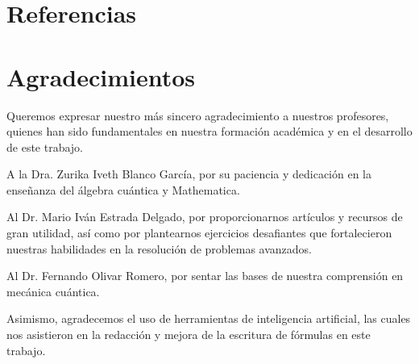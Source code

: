\documentclass[%
 aip,
 jmp,%
 amsmath,amssymb,
 reprint,
]{revtex4-2}
\begin{document}
\nocite{*}
\maketitle
\section{Referencias}

\section{Agradecimientos}

Queremos expresar nuestro más sincero agradecimiento a nuestros profesores, quienes han sido fundamentales en nuestra formación académica y en el desarrollo de este trabajo.

A la Dra. Zurika Iveth Blanco García, por su paciencia y dedicación en la enseñanza del álgebra cuántica y Mathematica.

Al Dr. Mario Iván Estrada Delgado, por proporcionarnos artículos y recursos de gran utilidad, así como por plantearnos ejercicios desafiantes que fortalecieron nuestras habilidades en la resolución de problemas avanzados.

Al Dr. Fernando Olivar Romero, por sentar las bases de nuestra comprensión en mecánica cuántica.

Asimismo, agradecemos el uso de herramientas de inteligencia artificial, las cuales nos asistieron en la redacción y mejora de la escritura de fórmulas en este trabajo.
\end{document}
